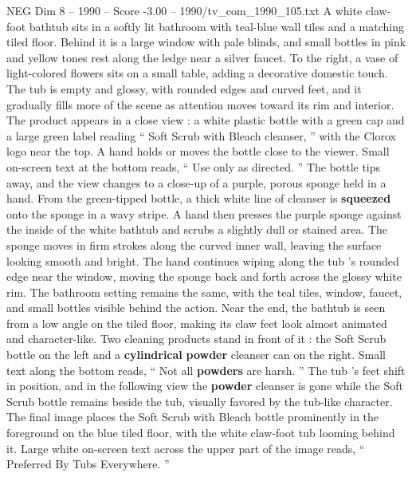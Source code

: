 \begin{textsample}{NEG Dim 8 – 1990 – Score -3.00 – 1990/tv\_com\_1990\_105.txt}  \label{ex:f8_neg_035}
A white claw-foot bathtub sits in a softly lit bathroom with teal-blue wall tiles and a matching tiled floor.
Behind it is a large window with pale blinds, and small bottles in pink and yellow tones rest along the ledge near a silver faucet.
To the right, a vase of light-colored flowers sits on a small table, adding a decorative domestic touch.
The tub is empty and glossy, with rounded edges and curved feet, and it gradually fills more of the scene as attention moves toward its rim and interior.
The product appears in a close view : a white plastic bottle with a green cap and a large green label reading “ Soft Scrub with Bleach cleanser, ” with the Clorox logo near the top.
A hand holds or moves the bottle close to the viewer.
Small on-screen text at the bottom reads, “ Use only as directed. ” The bottle tips away, and the view changes to a close-up of a purple, porous sponge held in a hand.
From the green-tipped bottle, a thick white line of cleanser is \textbf{squeezed} onto the sponge in a wavy stripe.
A hand then presses the purple sponge against the inside of the white bathtub and scrubs a slightly dull or stained area.
The sponge moves in firm strokes along the curved inner wall, leaving the surface looking smooth and bright.
The hand continues wiping along the tub ’s rounded edge near the window, moving the sponge back and forth across the glossy white rim.
The bathroom setting remains the same, with the teal tiles, window, faucet, and small bottles visible behind the action.
Near the end, the bathtub is seen from a low angle on the tiled floor, making its claw feet look almost animated and character-like.
Two cleaning products stand in front of it : the Soft Scrub bottle on the left and a \textbf{cylindrical} \textbf{powder} cleanser can on the right.
Small text along the bottom reads, “ Not all \textbf{powders} are harsh. ” The tub ’s feet shift in position, and in the following view the \textbf{powder} cleanser is gone while the Soft Scrub bottle remains beside the tub, visually favored by the tub-like character.
The final image places the Soft Scrub with Bleach bottle prominently in the foreground on the blue tiled floor, with the white claw-foot tub looming behind it.
Large white on-screen text across the upper part of the image reads, “ Preferred By Tubs Everywhere. ”

\end{textsample}
